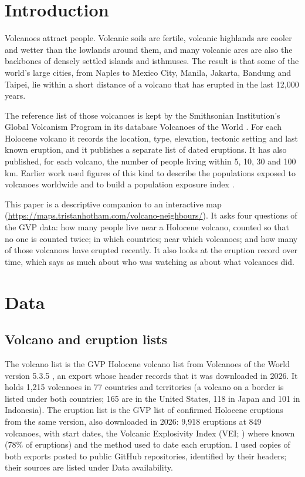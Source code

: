 \documentclass[11pt,a4paper]{article}
\begin{document}
\section{Introduction}
Volcanoes attract people. Volcanic soils are fertile, volcanic highlands are cooler and wetter than the lowlands around them, and many volcanic arcs are also the backbones of densely settled islands and isthmuses. The result is that some of the world's large cities, from Naples to Mexico City, Manila, Jakarta, Bandung and Taipei, lie within a short distance of a volcano that has erupted in the last 12,000 years.

The reference list of those volcanoes is kept by the Smithsonian Institution's Global Volcanism Program in its database Volcanoes of the World \citep{gvp535}. For each Holocene volcano it records the location, type, elevation, tectonic setting and last known eruption, and it publishes a separate list of dated eruptions. It has also published, for each volcano, the number of people living within 5, 10, 30 and 100 km. Earlier work used figures of this kind to describe the populations exposed to volcanoes worldwide and to build a population exposure index \citep{brown2015}.

This paper is a descriptive companion to an interactive map (\url{https://maps.tristanhotham.com/volcano-neighbours/}). It asks four questions of the GVP data: how many people live near a Holocene volcano, counted so that no one is counted twice; in which countries; near which volcanoes; and how many of those volcanoes have erupted recently. It also looks at the eruption record over time, which says as much about who was watching as about what volcanoes did.

\section{Data}
\subsection{Volcano and eruption lists}
The volcano list is the GVP Holocene volcano list from Volcanoes of the World version 5.3.5 \citep{gvp535}, an export whose header records that it was downloaded in 2026. It holds 1,215 volcanoes in 77 countries and territories (a volcano on a border is listed under both countries; 165 are in the United States, 118 in Japan and 101 in Indonesia). The eruption list is the GVP list of confirmed Holocene eruptions from the same version, also downloaded in 2026: 9,918 eruptions at 849 volcanoes, with start dates, the Volcanic Explosivity Index (VEI; \citealt{newhall1982}) where known (78\% of eruptions) and the method used to date each eruption. I used copies of both exports posted to public GitHub repositories, identified by their headers; their sources are listed under Data availability.
\end{document}
